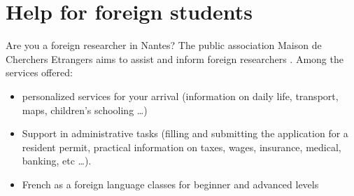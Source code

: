 
\section{Help for foreign students}
Are you a foreign researcher in Nantes?
The public association Maison de Cherchers Etrangers aims to assist and inform foreign researchers .
Among the services offered:
\begin{itemize}
   \item personalized services for your arrival (information on daily life, transport, maps, children's schooling \dots)
   \item Support in administrative tasks (filling and submitting the application for a resident permit, practical information on taxes, wages, insurance, medical, banking, etc \dots).
   \item French as a foreign language classes for beginner and advanced levels
\end{itemize}


